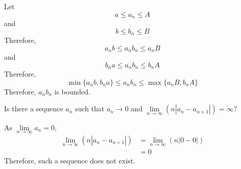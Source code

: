 \documentclass[fleqn, a4paper, 12pt, oneside]{amsart}
\theoremstyle{definition}
\theoremstyle{theorem}
\begin{document}
\begin{solution}
	Let
	\begin{equation*}
		a \le a_n \le A
	\end{equation*}
	and
	\begin{equation*}
		b \le b_n \le B
	\end{equation*}
	Therefore,
	\begin{equation*}
		a_n b \le a_n b_n \le a_n B
	\end{equation*}
	and 
	\begin{equation*}
		b_n a \le a_n b_n \le b_n A
	\end{equation*}
	Therefore, 
	\begin{equation*}
		\min \{a_n b, b_n a\} \le a_n b_n \le \max \{a_n B, b_n A\}
	\end{equation*}
	Therefore, $a_n b_n$ is bounded.
\end{solution}

\begin{question}
	Is there a sequence $a_n$ such that $a_n \to 0$ and $\lim\limits_{n \to \infty} (n |a_n - a_{n + 1}|) = \infty$?
\end{question}

\begin{solution}
	As $\lim\limits_{n \to \infty} a_n = 0$,
	\begin{align*}
		\lim\limits_{n \to \infty} (n |a_n - a_{n + 1}|) &= \lim\limits_{n \to \infty} (n |0 - 0|)\\
		&= 0
	\end{align*}
	Therefore, such a sequence does not exist.
\end{solution}
\end{document}
